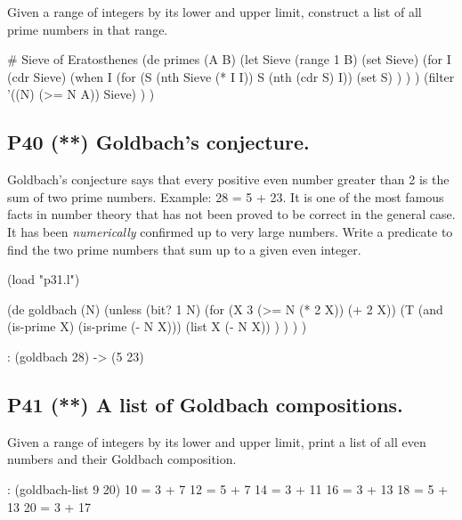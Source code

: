 Given a range of integers by its lower and upper limit, construct a list
of all prime numbers in that range.

\begin{wideverbatim}

# Sieve of Eratosthenes
(de primes (A B)
   (let Sieve (range 1 B)
      (set Sieve)
      (for I (cdr Sieve)
         (when I
            (for (S (nth Sieve (* I I)) S (nth (cdr S) I))
               (set S) ) ) )
      (filter '((N) (>= N A)) Sieve) ) )

\end{wideverbatim}

\subsection*{{P40} (**) Goldbach's conjecture.}
\label{sec:99-problems-P40}

Goldbach's conjecture says that every positive even number greater than
2 is the sum of two prime numbers. Example: 28 = 5 + 23. It is one of
the most famous facts in number theory that has not been proved to be
correct in the general case. It has been \emph{numerically} confirmed up
to very large numbers. Write a predicate to find the two prime numbers
that sum up to a given even integer.

\begin{wideverbatim}

(load "p31.l")

(de goldbach (N)
   (unless (bit? 1 N)
      (for (X 3  (>= N (* 2 X))  (+ 2 X))
         (T (and (is-prime X) (is-prime (- N X)))
            (list X (- N X)) ) ) ) )

\end{wideverbatim}

\begin{wideverbatim}
   : (goldbach 28)
   -> (5 23)
\end{wideverbatim}

\pagebreak{}
\subsection*{{P41} (**) A list of Goldbach
compositions.}
\label{sec:99-problems-P41}

Given a range of integers by its lower and upper limit, print a list of
all even numbers and their Goldbach composition.

\begin{wideverbatim}
   : (goldbach-list 9 20)
   10 = 3 + 7
   12 = 5 + 7
   14 = 3 + 11
   16 = 3 + 13
   18 = 5 + 13
   20 = 3 + 17
\end{wideverbatim}

